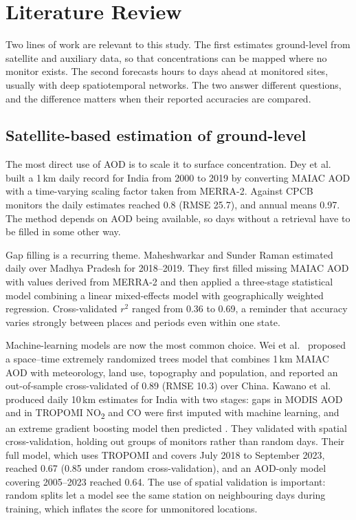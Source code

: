 \chapter{Literature Review}

Two lines of work are relevant to this study. The first estimates ground-level \pmtf{} from
satellite and auxiliary data, so that concentrations can be mapped where no monitor exists. The
second forecasts \pmtf{} hours to days ahead at monitored sites, usually with deep spatiotemporal
networks. The two answer different questions, and the difference matters when their reported
accuracies are compared.

\section{Satellite-based estimation of ground-level \texorpdfstring{\pmtf{}}{PM2.5}}

The most direct use of AOD is to scale it to surface concentration. Dey et al.\ \cite{dey2020india}
built a 1\,km daily \pmtf{} record for India from 2000 to 2019 by converting MAIAC AOD with a
time-varying scaling factor taken from MERRA-2. Against CPCB monitors the daily estimates reached
\rsq{} 0.8 (RMSE 25.7\ugm{}), and annual means 0.97. The method depends on AOD being available, so
days without a retrieval have to be filled in some other way.

Gap filling is a recurring theme. Maheshwarkar and Sunder Raman \cite{maheshwarkar2021central}
estimated daily \pmtf{} over Madhya Pradesh for 2018--2019. They first filled missing MAIAC AOD with
values derived from MERRA-2 and then applied a three-stage statistical model combining a linear
mixed-effects model with geographically weighted regression. Cross-validated $r^2$ ranged from
0.36 to 0.69, a reminder that accuracy varies strongly between places and periods even within one
state.

Machine-learning models are now the most common choice. Wei et al.\ \cite{wei2020stet} proposed a
space--time extremely randomized trees model that combines 1\,km MAIAC AOD with meteorology, land
use, topography and population, and reported an out-of-sample cross-validated \rsq{} of 0.89
(RMSE 10.3\ugm{}) over China. Kawano et al.\ \cite{kawano2025india} produced daily 10\,km estimates
for India with two stages: gaps in MODIS AOD and in TROPOMI NO\textsubscript{2} and CO were first
imputed with machine learning, and an extreme gradient boosting model then predicted \pmtf{}. They
validated with spatial cross-validation, holding out groups of monitors rather than random days.
Their full model, which uses TROPOMI and covers July 2018 to September 2023, reached \rsq{} 0.67
(0.85 under random cross-validation), and an AOD-only model covering 2005--2023 reached 0.64.
The use of spatial validation is important: random splits let a model see the same station on
neighbouring days during training, which inflates the score for unmonitored locations.

